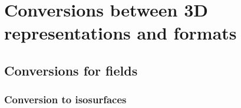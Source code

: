 
\setchapterpreamble[u]{\margintoc}

\graphicspath{{conversion/}}

\chapter{Conversions between 3D representations and formats}%
\label{chap:conversion}




%
\section{Conversions for fields}

\subsection{Conversion to isosurfaces}

